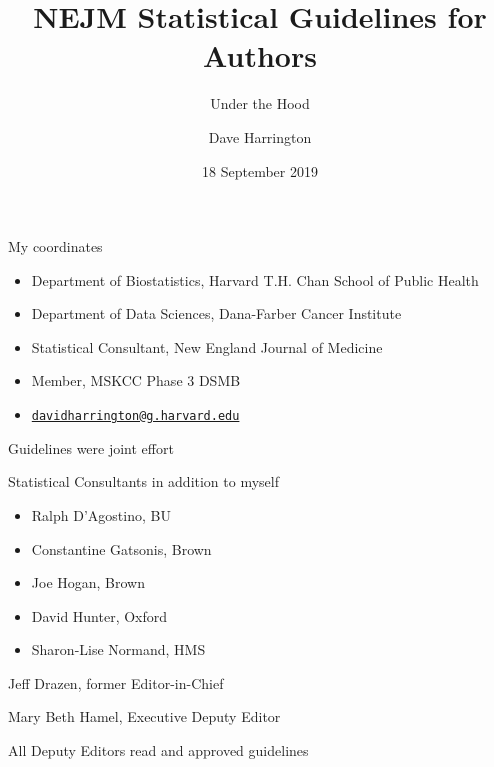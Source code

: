 \documentclass[ignorenonframetext,]{beamer}
\title{NEJM Statistical Guidelines for Authors}
\subtitle{Under the Hood}
\author{Dave Harrington}
\date{18 September 2019}
\providecommand{\tightlist}{%
  \setlength{\itemsep}{0pt}\setlength{\parskip}{0pt}}
\begin{document}
\frame{\titlepage}

\begin{frame}{My coordinates}
\protect\hypertarget{my-coordinates}{}

\begin{itemize}
\item
  Department of Biostatistics, Harvard T.H. Chan School of Public Health
\item
  Department of Data Sciences, Dana-Farber Cancer Institute
\item
  Statistical Consultant, New England Journal of Medicine
\item
  Member, MSKCC Phase 3 DSMB
\item
  \href{mailto:davidharrington@g.harvard.edu}{\nolinkurl{davidharrington@g.harvard.edu}}
\end{itemize}

\end{frame}

\begin{frame}{Guidelines were joint effort}
\protect\hypertarget{guidelines-were-joint-effort}{}

Statistical Consultants in addition to myself

\begin{itemize}
\tightlist
\item
  Ralph D'Agostino, BU\\
\item
  Constantine Gatsonis, Brown\\
\item
  Joe Hogan, Brown
\item
  David Hunter, Oxford\\
\item
  Sharon-Lise Normand, HMS
\end{itemize}

Jeff Drazen, former Editor-in-Chief

Mary Beth Hamel, Executive Deputy Editor

All Deputy Editors read and approved guidelines

\end{frame}
\end{document}
